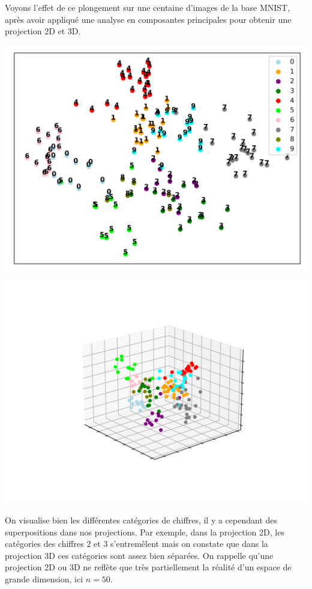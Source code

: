 \documentclass[11pt,class=report,crop=false]{standalone}
\begin{document}
Voyons l'effet de ce plongement sur une centaine d'images de la base MNIST, après avoir appliqué une analyse en composantes principales pour obtenir une projection 2D et 3D.

\begin{center}
	\includegraphics[scale=\myscale,scale=0.5]{figures/mnist-embed-1}
	\includegraphics[scale=\myscale,scale=0.7,trim={2cm 2cm 2cm 2cm},clip]{figures/mnist-embed-2}
\end{center}

On visualise bien les différentes catégories de chiffres, il y a cependant des superpositions dans nos projections. Par exemple, dans la projection 2D, les catégories des chiffres $2$ et $3$ s’entremêlent mais on constate que dans la projection 3D ces catégories sont assez bien séparées. On rappelle qu'une projection 2D ou 3D ne reflète que très partiellement la réalité d'un espace de grande dimension, ici $n=50$. 
\end{document}
